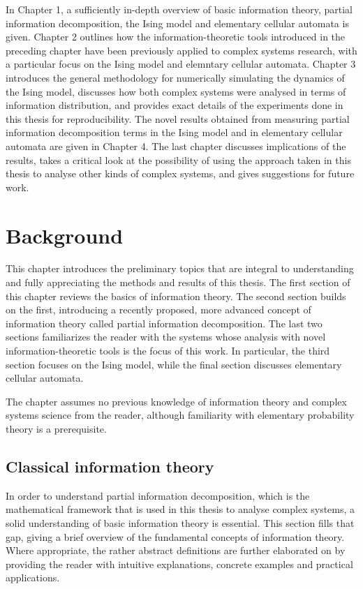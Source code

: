 \documentclass[12pt]{article}
\begin{document}
In Chapter 1, a sufficiently in-depth overview of basic information theory, partial information decomposition, the Ising model and elementary cellular automata is given. Chapter 2 outlines how the information-theoretic tools introduced in the preceding chapter have been previously applied to complex systems research, with a particular focus on the Ising model and elemntary cellular automata. Chapter 3 introduces the general methodology for numerically simulating the dynamics of the Ising model, discusses how both complex systems were analysed in terms of information distribution, and provides exact details of the experiments done in this thesis for reproducibility. The novel results obtained from measuring partial information decomposition terms in the Ising model and in elementary cellular automata are given in Chapter 4. The last chapter discusses implications of the results, takes a critical look at the possibility of using the approach taken in this thesis to analyse other kinds of complex systems, and gives suggestions for future work.  

\newpage

\section{Background}

This chapter introduces the preliminary topics that are integral to understanding and fully appreciating the methods and results of this thesis. The first section of this chapter reviews the basics of information theory. The second section builds on the first, introducing a recently proposed, more advanced concept of information theory called partial information decomposition. The last two sections familiarizes the reader with the systems whose analysis with novel information-theoretic tools is the focus of this work. In particular, the third section focuses on the Ising model, while the final section discusses elementary cellular automata.

The chapter assumes no previous knowledge of information theory and complex systems science from the reader, although familiarity with elementary probability theory is a prerequisite. 

\subsection{Classical information theory}

In order to understand partial information decomposition, which is the mathematical framework that is used in this thesis to analyse complex systems, a solid understanding of basic information theory is essential. This section fills that gap, giving a brief overview of the fundamental concepts of information theory. Where appropriate, the rather abstract definitions are further elaborated on by providing the reader with intuitive explanations, concrete examples and practical applications. 
\end{document}
